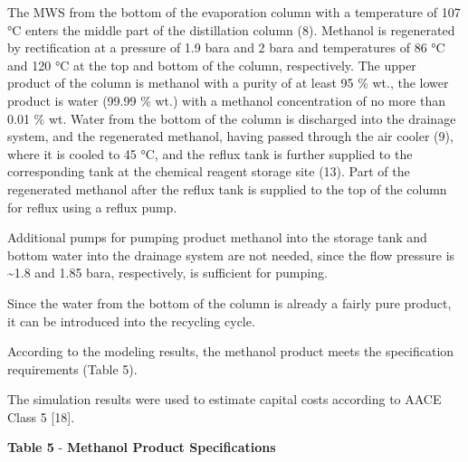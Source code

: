 The MWS from the bottom of the evaporation column with a temperature of
107 °C enters the middle part of the distillation column (8). Methanol
is regenerated by rectification at a pressure of 1.9 bara and 2 bara and
temperatures of 86 °C and 120 °C at the top and bottom of the column,
respectively. The upper product of the column is methanol with a purity
of at least 95 \% wt., the lower product is water (99.99 \% wt.) with a
methanol concentration of no more than 0.01 \% wt. Water from the bottom
of the column is discharged into the drainage system, and the
regenerated methanol, having passed through the air cooler (9), where it
is cooled to 45 °C, and the reflux tank is further supplied to the
corresponding tank at the chemical reagent storage site (13). Part of
the regenerated methanol after the reflux tank is supplied to the top of
the column for reflux using a reflux pump.

Additional pumps for pumping product methanol into the storage tank and
bottom water into the drainage system are not needed, since the flow
pressure is \textasciitilde1.8 and 1.85 bara, respectively, is
sufficient for pumping.

Since the water from the bottom of the column is already a fairly pure
product, it can be introduced into the recycling cycle.

According to the modeling results, the methanol product meets the
specification requirements (Table 5).

The simulation results were used to estimate capital costs according to
AACE Class 5 {[}18{]}.

{\bfseries Table 5} - {\bfseries Methanol Product Specifications}

